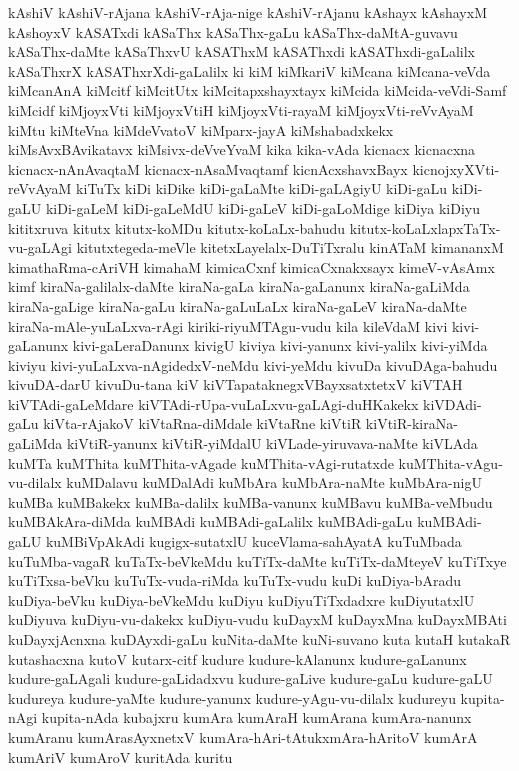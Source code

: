{kAshiV
kAshiV-rAjana
kAshiV-rAja-nige
kAshiV-rAjanu
kAshayx
kAshayxM
kAshoyxV
kASATxdi
kASaThx
kASaThx-gaLu
kASaThx-daMtA-guvavu
kASaThx-daMte
kASaThxvU
kASAThxM
kASAThxdi
kASAThxdi-gaLalilx
kASaThxrX
kASAThxrXdi-gaLalilx
ki
kiM
kiMkariV
kiMcana
kiMcana-veVda
kiMcanAnA
kiMcitf
kiMcitUtx
kiMcitapxshayxtayx
kiMcida
kiMcida-veVdi-Samf
kiMcidf
kiMjoyxVti
kiMjoyxVtiH
kiMjoyxVti-rayaM
kiMjoyxVti-reVvAyaM
kiMtu
kiMteVna
kiMdeVvatoV
kiMparx-jayA
kiMshabadxkekx
kiMsAvxBAvikatavx
kiMsivx-deVveYvaM
kika
kika-vAda
kicnacx
kicnacxna
kicnacx-nAnAvaqtaM
kicnacx-nAsaMvaqtamf
kicnAcxshavxBayx
kicnojxyXVti-reVvAyaM
kiTuTx
kiDi
kiDike
kiDi-gaLaMte
kiDi-gaLAgiyU
kiDi-gaLu
kiDi-gaLU
kiDi-gaLeM
kiDi-gaLeMdU
kiDi-gaLeV
kiDi-gaLoMdige
kiDiya
kiDiyu
kititxruva
kitutx
kitutx-koMDu
kitutx-koLaLx-bahudu
kitutx-koLaLxlapxTaTx-vu-gaLAgi
kitutxtegeda-meVle
kitetxLayelalx-DuTiTxralu
kinATaM
kimananxM
kimathaRma-cAriVH
kimahaM
kimicaCxnf
kimicaCxnakxsayx
kimeV-vAsAmx
kimf
kiraNa-galilalx-daMte
kiraNa-gaLa
kiraNa-gaLanunx
kiraNa-gaLiMda
kiraNa-gaLige
kiraNa-gaLu
kiraNa-gaLuLaLx
kiraNa-gaLeV
kiraNa-daMte
kiraNa-mAle-yuLaLxva-rAgi
kiriki-riyuMTAgu-vudu
kila
kileVdaM
kivi
kivi-gaLanunx
kivi-gaLeraDanunx
kivigU
kiviya
kivi-yanunx
kivi-yalilx
kivi-yiMda
kiviyu
kivi-yuLaLxva-nAgidedxV-neMdu
kivi-yeMdu
kivuDa
kivuDAga-bahudu
kivuDA-darU
kivuDu-tana
kiV
kiVTapataknegxVBayxsatxtetxV
kiVTAH
kiVTAdi-gaLeMdare
kiVTAdi-rUpa-vuLaLxvu-gaLAgi-duHKakekx
kiVDAdi-gaLu
kiVta-rAjakoV
kiVtaRna-diMdale
kiVtaRne
kiVtiR
kiVtiR-kiraNa-gaLiMda
kiVtiR-yanunx
kiVtiR-yiMdalU
kiVLade-yiruvava-naMte
kiVLAda
kuMTa
kuMThita
kuMThita-vAgade
kuMThita-vAgi-rutatxde
kuMThita-vAgu-vu-dilalx
kuMDalavu
kuMDalAdi
kuMbAra
kuMbAra-naMte
kuMbAra-nigU
kuMBa
kuMBakekx
kuMBa-dalilx
kuMBa-vanunx
kuMBavu
kuMBa-veMbudu
kuMBAkAra-diMda
kuMBAdi
kuMBAdi-gaLalilx
kuMBAdi-gaLu
kuMBAdi-gaLU
kuMBiVpAkAdi
kugigx-sutatxlU
kuceVlama-sahAyatA
kuTuMbada
kuTuMba-vagaR
kuTaTx-beVkeMdu
kuTiTx-daMte
kuTiTx-daMteyeV
kuTiTxye
kuTiTxsa-beVku
kuTuTx-vuda-riMda
kuTuTx-vudu
kuDi
kuDiya-bAradu
kuDiya-beVku
kuDiya-beVkeMdu
kuDiyu
kuDiyuTiTxdadxre
kuDiyutatxlU
kuDiyuva
kuDiyu-vu-dakekx
kuDiyu-vudu
kuDayxM
kuDayxMna
kuDayxMBAti
kuDayxjAcnxna
kuDAyxdi-gaLu
kuNita-daMte
kuNi-suvano
kuta
kutaH
kutakaR
kutashacxna
kutoV
kutarx-citf
kudure
kudure-kAlanunx
kudure-gaLanunx
kudure-gaLAgali
kudure-gaLidadxvu
kudure-gaLive
kudure-gaLu
kudure-gaLU
kudureya
kudure-yaMte
kudure-yanunx
kudure-yAgu-vu-dilalx
kudureyu
kupita-nAgi
kupita-nAda
kubajxru
kumAra
kumAraH
kumArana
kumAra-nanunx
kumAranu
kumArasAyxnetxV
kumAra-hAri-tAtukxmAra-hAritoV
kumArA
kumAriV
kumAroV
kuritAda
kuritu
}
